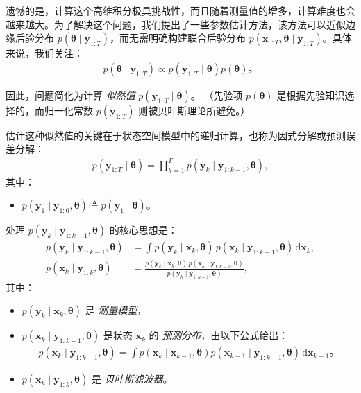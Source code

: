 遗憾的是，计算这个高维积分极具挑战性，而且随着测量值的增多，计算难度也会越来越大。为了解决这个问题，我们提出了一些参数估计方法，该方法可以近似边缘后验分布 \(p(\boldsymbol{\theta} \mid \mathbf{y}_{1:T})\)，而无需明确构建联合后验分布 \(p(\mathbf{x}_{0:T}, \boldsymbol{\theta} \mid \mathbf{y}_{1:T})\)。具体来说，我们关注：
\begin{align}
p(\boldsymbol{\theta} \mid \mathbf{y}_{1:T}) \propto p(\mathbf{y}_{1:T} \mid \boldsymbol{\theta}) p(\boldsymbol{\theta})。
\end{align}

因此，问题简化为计算 \textit{似然值} \(p(\mathbf{y}_{1:T} \mid \boldsymbol{\theta})\)。 （先验项 \(p(\boldsymbol{\theta})\) 是根据先验知识选择的，而归一化常数 \(p(\mathbf{y}_{1:T})\) 则被贝叶斯理论所避免。）

估计这种似然值的关键在于状态空间模型中的递归计算，也称为因式分解或预测误差分解：
\begin{align}
p(\mathbf{y}_{1:T} \mid \boldsymbol{\theta}) = \prod^T_{k=1} p(\mathbf{y}_k \mid \mathbf{y}_{1:k-1}, \boldsymbol{\theta}),
\end{align}
其中：
\begin{itemize}
\item \(p(\mathbf{y}_1 \mid \mathbf{y}_{1:0}, \boldsymbol{\theta}) \triangleq p(\mathbf{y}_1 \mid \boldsymbol{\theta})\)。
\end{itemize}

处理 \(p(\mathbf{y}_k \mid \mathbf{y}_{1:k-1}, \boldsymbol{\theta})\) 的核心思想是：
\begin{align}
 p(\mathbf{y}_k \mid \mathbf{y}_{1:k-1}, \boldsymbol{\theta}) &= \int p(\mathbf{y}_k \mid \mathbf{x}_k, \boldsymbol{\theta}) \, p(\mathbf{x}_k \mid \mathbf{y}_{1:k-1}, \boldsymbol{\theta}) \, \mathrm{d} \mathbf{x}_k, \\
 p(\mathbf{x}_k \mid \mathbf{y}_{1:k}, \boldsymbol{\theta}) &= \frac{p(\mathbf{y}_k \mid \mathbf{x}_k, \boldsymbol{\theta}) \, p(\mathbf{x}_k \mid \mathbf{y}_{1:k-1}, \boldsymbol{\theta})}{p(\mathbf{y}_k \mid \mathbf{y}_{1:k-1}, \boldsymbol{\theta})},
\end{align}
其中：
\begin{itemize}
 \item \(p(\mathbf{y}_k \mid \mathbf{x}_k, \boldsymbol{\theta})\) 是 \textit{测量模型}，
 \item \(p(\mathbf{x}_k \mid \mathbf{y}_{1:k-1}, \boldsymbol{\theta})\) 是状态 \(\mathbf{x}_k\) 的 \textit{预测分布}，由以下公式给出：
\begin{align}
p(\mathbf{x}_k \mid \mathbf{y}_{1:k-1}, \boldsymbol{\theta}) = \int p(\mathbf{x}_k \mid \mathbf{x}_{k-1}, \boldsymbol{\theta}) p(\mathbf{x}_{k-1} \mid \mathbf{y}_{1:k-1}, \boldsymbol{\theta}) \, \mathrm{d} \mathbf{x}_{k-1}。
\end{align}
\item \(p(\mathbf{x}_k \mid \mathbf{y}_{1:k}, \boldsymbol{\theta})\) 是 \textit{贝叶斯滤波器}。
\end{itemize}

